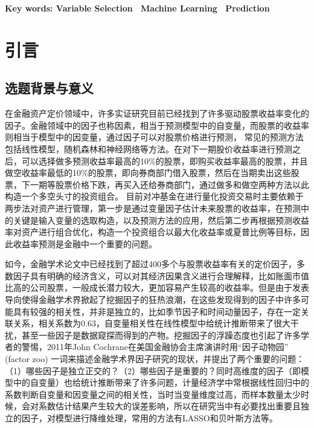 \documentclass[12pt]{article} %
\begin{document}
	\textbf{Key words: Variable Selection~ Machine Learning~ Prediction}
	
	\newpage
	\thispagestyle{empty}
	\tableofcontents
	
	\newpage
	\thispagestyle{empty}
	\listoffigures
	
	\listoftables
	
	\newpage
	\setcounter{page}{1}
	\section{引言}
	
	\subsection{选题背景与意义}
	在金融资产定价领域中，许多实证研究目前已经找到了许多驱动股票收益率变化的因子。金融领域中的因子也称因素，相当于预测模型中的自变量，而股票的收益率则相当于模型中的因变量，通过因子可以对股票价格进行预测，
	常见的预测方法包括线性模型，随机森林和神经网络等方法。在对下一期股价收益率进行预测之后，可以选择做多预测收益率最高的10\%的股票，即购买收益率最高的股票，并且做空收益率最低的10\%的股票，即向券商部门借入股票，然后在当期卖出这些股票，下一期等股票价格下跌，再买入还给券商部门，通过做多和做空两种方法以此构造一个多空头寸的投资组合。
	目前对冲基金在进行量化投资交易时主要依赖于两步法对资产进行管理，第一步是通过变量因子估计未来股票的收益率，在预测中的关键是输入变量的选取构造，以及预测方法的应用，然后第二步再根据预测收益率对资产进行组合优化，构造一个投资组合以最大化收益率或夏普比例等目标\cite{cong2021alphaportfolio}，因此收益率预测是金融中一个重要的问题。
	
	如今，金融学术论文中已经找到了超过400多个与股票收益率有关的定价因子，多数因子具有明确的经济含义，可以对其经济因果含义进行合理解释，比如账面市值比高的公司股票，一般成长潜力较大，更加容易产生较高的收益率。但是由于发表导向使得金融学术界掀起了挖掘因子的狂热浪潮，在这些发现得到的因子中许多可能具有较强的相关性，并非是独立的，比如季节因子和时间动量因子，存在一定关联关系，相关系数为0.63，自变量相关性在线性模型中给统计推断带来了很大干扰，甚至一些因子是数据窥探而得到的产物\cite{feng2020taming}。挖掘因子的浮躁态度也引起了许多学者的警惕，2011年John Cochrane在美国金融协会主席演讲时用“因子动物园” (factor zoo) 一词来描述金融学术界因子研究的现状，并提出了两个重要的问题：（1）哪些因子是独立正交的？（2）哪些因子是重要的？同时高维度的因子（即模型中的自变量）也给统计推断带来了许多问题，计量经济学中常根据线性回归中的系数判断自变量和因变量之间的相关性，当时当变量维度过高，而样本数量太少时候，会对系数估计结果产生较大的误差影响，所以在研究当中有必要找出重要且独立的因子，对模型进行降维处理，常用的方法有LASSO和贝叶斯方法等。
	
\end{document}
